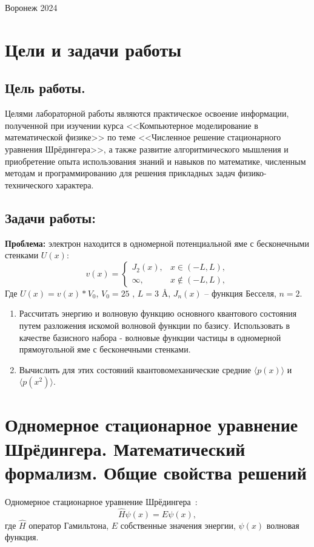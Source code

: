 \documentclass[a4paper,12pt]{article}
\begin{document}
\vspace{3cm}
\begin{center}
Воронеж 2024
\end{center}

\newpage
\tableofcontents
\pagestyle{plain}
\setcounter{page}{2}

\newpage
\section{Цели и задачи работы}\label{sec:goals}
\subsection{Цель работы.}\label{subsec:-.}
Целями лабораторной работы являются практическое освоение информации, полученной при изучении курса <<Компьютерное моделирование в математической физике>> по теме <<Численное решение стационарного уравнения Шрёдингера>>, а также развитие алгоритмического мышления и приобретение опыта использования знаний и навыков по математике, численным методам и программированию для решения прикладных задач физико-технического характера.

\subsection{Задачи работы:}\label{subsec:-:}

\textbf{Проблема:} электрон находится в одномерной потенциальной яме с бесконечными стенками $U(x)$:
\[
v(x) =
    \begin{cases}
        J_2(x), & x \in (-L, L), \\
        \infty, & x \notin (-L, L),
    \end{cases}
\]
Где $U(x) = v(x)*V_0$, $V_0 = 25$ , $L = 3$ \AA, $J_n(x)$ -- функция Бесселя, $n = 2$.

\begin{enumerate}
    \item Рассчитать энергию и волновую функцию основного квантового состояния путем разложения искомой волновой функции по базису.
          Использовать в качестве базисного набора - волновые функции частицы в одномерной прямоугольной яме с бесконечными стенками.
    \item Вычислить для этих состояний квантовомеханические средние $\langle p(x) \rangle$ и $ \langle p(x^2) \rangle $.
\end{enumerate}

\newpage
\section{Одномерное стационарное уравнение Шрёдингера. Математический формализм. Общие свойства решений}\label{sec:-}
Одномерное стационарное уравнение Шрёдингера~\cite{tim_shrod}:
\begin{equation}
    \hat{H}\psi(x) = E\psi(x),
    \label{eq:oneDimShrodingerEq}
\end{equation}
где $\hat{H}$ \textendash{} оператор Гамильтона, $E$ \textendash{} собственные значения энергии, $\psi(x)$ \textendash{} волновая функция.
\end{document}
